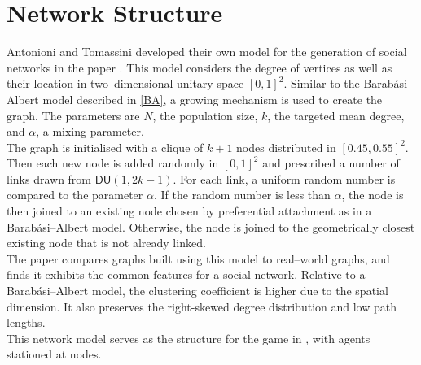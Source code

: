 \section{Network Structure}
Antonioni and Tomassini developed their own model for the generation of social networks in the paper \cite{RN51}. This model considers the degree of vertices as well as their location in two--dimensional unitary space $[0,1]^2$. Similar to the Barab\'{a}si--Albert model described in \ref{BA}, a growing mechanism is used to create the graph. The parameters are $N$, the population size, $k$, the targeted mean degree, and $\alpha$, a mixing parameter. \\

The graph is initialised with a clique of $k+1$ nodes distributed in $[0.45, 0.55]^2$. Then each new node is added randomly in $[0,1]^2$ and prescribed a number of links drawn from $\mathsf{DU}(1,2k-1)$. For each link, a uniform random number is compared to the parameter $\alpha$. If the random number is less than $\alpha$, the node is then joined to an existing node chosen by preferential attachment as in a Barab\'{a}si--Albert model. Otherwise, the node is joined to the geometrically closest existing node that is not already linked. \\

The paper \cite{RN51} compares graphs built using this model to real--world graphs, and finds it exhibits the common features for a social network. Relative to a Barab\'{a}si--Albert model, the clustering coefficient is higher due to the spatial dimension. It also preserves the right-skewed degree distribution and low path lengths. \\

This network model serves as the structure for the game in \cite{RN49}, with agents stationed at nodes.

